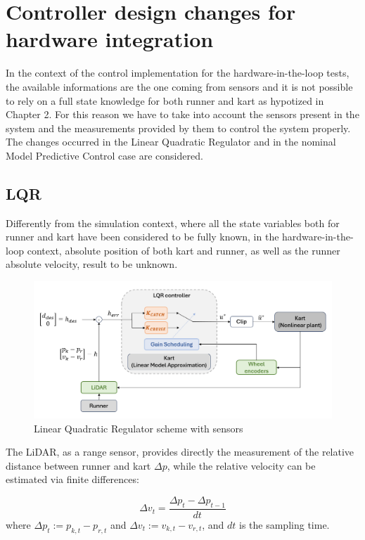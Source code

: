 \documentclass[a4paper,12pt,oneside]{book}
\begin{document}
\newpage
\section{Controller design changes for hardware integration}
In the context of the control implementation for the hardware-in-the-loop tests, the available informations are the one coming from sensors and it is not possible to rely on a full state knowledge for both runner and kart as hypotized in Chapter 2.
For this reason we have to take into account the sensors present in the system and the measurements provided by them to control the system properly. 
The changes occurred in the Linear Quadratic Regulator and in the nominal Model Predictive Control case are considered.

\subsection*{LQR}
Differently from the simulation context, where all the state variables both for runner and kart have been considered to be fully known, in the hardware-in-the-loop context, absolute position of both kart and runner, as well as the runner absolute velocity, result to be unknown.

\begin{figure} [h!]
	\centering
	\includegraphics[width=1.0\textwidth]{LQR_hard_scheme.png}
	\caption{Linear Quadratic Regulator scheme with sensors}
	\label{image:LQR_hard_scheme}
\end{figure}

The LiDAR, as a range sensor, provides directly the measurement of the relative distance between runner and kart $\Delta p$, while the relative velocity can be estimated via finite differences:

\begin{equation}
	\Delta v_t = \frac{\Delta p_t - \Delta p_{t-1}} {dt}
\end{equation}
where $\Delta p_t := p_{k,t} - p_{r,t}$ and $\Delta v_t := v_{k,t} - v_ {r,t}$, and $dt$ is the sampling time.
\end{document}

